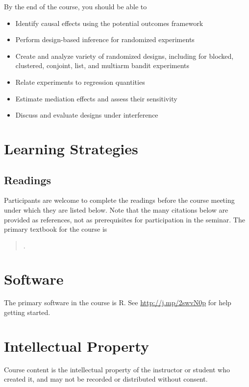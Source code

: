 \documentclass[11pt]{article}
\newcommand{\bibverse}[1]{\begin{verse} \bibentry{#1}. \end{verse}}
\begin{document}
By the end of the course, you should be able to

\begin{itemize}
\item Identify causal effects using the potential outcomes framework
\item Perform design-based inference for randomized experiments
\item Create and analyze variety of randomized designs, including for blocked, clustered, conjoint, list, and multiarm bandit experiments
\item Relate experiments to regression quantities
\item Estimate mediation effects and assess their sensitivity
\item Discuss and evaluate designs under interference
\end{itemize}

\section*{Learning Strategies}

\subsection*{Readings}

Participants are welcome to complete the readings before the course meeting under which they are listed below. Note that the many citations below are provided as references, not as prerequisites for participation in the seminar. The primary textbook for the course is

\nobibliography*

\bibverse{gergre12}

\section*{Software}

The primary software in the course is R. See \href{http://www.ryantmoore.org/files/class/introPolResearch/intro_R_short.pdf}{http://j.mp/2swvN0p}
for help getting started.

\section*{Intellectual Property}

Course content is the intellectual property of the instructor or student who created it, and may not be recorded or distributed without consent.
\end{document}
